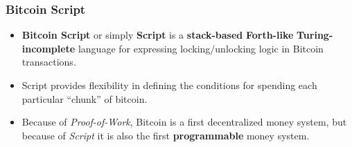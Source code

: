 \documentclass{beamer}
\begin{document}
\begin{frame}[fragile]
  \frametitle{Bitcoin Script}
  \begin{itemize}
  \item \textbf{Bitcoin Script} or simply \textbf{Script} is a
    \textbf{stack-based} \textbf{Forth-like} \textbf{Turing-incomplete} language
    for expressing locking/unlocking logic in Bitcoin transactions.
  \item Script provides flexibility in defining the conditions for spending each
    particular ``chunk'' of bitcoin.
  \item Because of \textit{Proof-of-Work}, Bitcoin is a first decentralized
    money system, but because of \textit{Script} it is also the first
    \textbf{programmable} money system.
  \end{itemize}
\end{frame}
\end{document}

